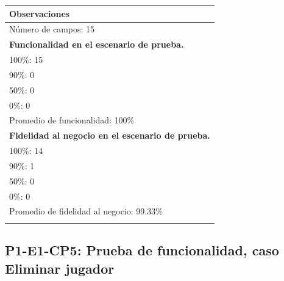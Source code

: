 \documentclass[oneside,10pt]{book}
\begin{document}
\begin{tabularx}{\textwidth}{ X }
\multicolumn{1}{X}{\cellcolor[HTML]{9B9B9B}\textbf{Observaciones}} \\ \hline
\multicolumn{1}{|l|}{Número de campos: 15 }	\\
\multicolumn{1}{|l|}{\textbf{Funcionalidad en el escenario de prueba.} }	\\
\multicolumn{1}{|l|}{100\%: 15 }	\\
\multicolumn{1}{|l|}{90\%: 0 }	\\
\multicolumn{1}{|l|}{50\%: 0 }	\\
\multicolumn{1}{|l|}{0\%: 0 }	\\
\multicolumn{1}{|l|}{Promedio de funcionalidad: 100\% }	\\
\multicolumn{1}{|l|}{\textbf{Fidelidad al negocio en el escenario de prueba.} }	\\
\multicolumn{1}{|l|}{100\%: 14 }	\\
\multicolumn{1}{|l|}{90\%: 1 }	\\
\multicolumn{1}{|l|}{50\%: 0 }	\\
\multicolumn{1}{|l|}{0\%: 0 }	\\
\multicolumn{1}{|l|}{Promedio de fidelidad al negocio: 99.33\% }	\\
\multicolumn{1}{|l|}{ }	\\ \hline
\end{tabularx}
\newpage
\subsection{P1-E1-CP5: Prueba de funcionalidad, caso Eliminar jugador}
\end{document}
